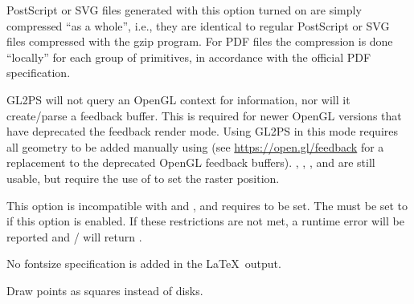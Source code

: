 \begin{description}
\begin{description}
  PostScript or SVG files generated with this option turned on are
  simply compressed ``as a whole'', i.e., they are identical to
  regular PostScript or SVG files compressed with the gzip
  program. For PDF files the compression is done ``locally'' for each
  group of primitives, in accordance with the official PDF
  specification.
\item[\dd{GL2PS_NO_OPENGL_CONTEXT}] GL2PS will not query an OpenGL
  context for information, nor will it create/parse a feedback
  buffer. This is required for newer OpenGL versions that have
  deprecated the feedback render mode. Using GL2PS in this mode
  requires all geometry to be added manually using
   (see \url{https://open.gl/feedback} for a
  replacement to the deprecated OpenGL feedback
  buffers). , , ,
  and  are still usable, but require the use of
   to set the raster position.

  This option is incompatible with  and
  , and requires 
  to be set. The   must be set to
   if this option is enabled. If these restrictions are
  not met, a runtime error will be reported and  /
   will return .
\item[\dd{GL2PS_NO_TEX_FONTSIZE}] No fontsize specification is added in the
  \LaTeX\ output.
\item[\dd{GL2PS_SQUARE_POINTS}] Draw points as squares instead of disks.
\end{description}


\end{description}
